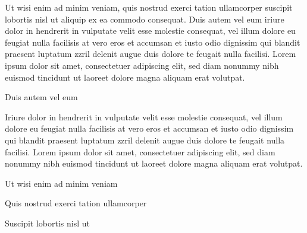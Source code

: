 \documentclass[11pt,twoside]{article}\makeatletter
\begin{document}
Ut wisi enim ad minim veniam, quis nostrud exerci tation ullamcorper suscipit lobortis nisl ut aliquip ex ea commodo consequat. Duis autem vel eum iriure dolor in hendrerit in vulputate velit esse molestie consequat, vel illum dolore eu feugiat nulla facilisis at vero eros et accumsan et iusto odio dignissim qui blandit praesent luptatum zzril delenit augue duis dolore te feugait nulla facilisi. Lorem ipsum dolor sit amet, consectetuer adipiscing elit, sed diam nonummy nibh euismod tincidunt ut laoreet dolore magna aliquam erat volutpat. \par
Duis autem vel eum \par
Iriure dolor in hendrerit in vulputate velit esse molestie consequat, vel illum dolore eu feugiat nulla facilisis at vero eros et accumsan et iusto odio dignissim qui blandit praesent luptatum zzril delenit augue duis dolore te feugait nulla facilisi. Lorem ipsum dolor sit amet, consectetuer adipiscing elit, sed diam nonummy nibh euismod tincidunt ut laoreet dolore magna aliquam erat volutpat. \par
Ut wisi enim ad minim veniam\par
Quis nostrud exerci tation ullamcorper \par
Suscipit lobortis nisl ut 
\end{document}
